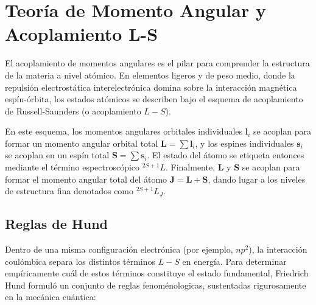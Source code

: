 \chapter{Teoría de Momento Angular y Acoplamiento L-S}
\label{ap:momento-angular}

El acoplamiento de momentos angulares es el pilar para comprender la estructura de la materia a nivel atómico. En elementos ligeros y de peso medio, donde la repulsión electrostática interelectrónica domina sobre la interacción magnética espín-órbita, los estados atómicos se describen bajo el esquema de acoplamiento de Russell-Saunders (o acoplamiento $L-S$).

En este esquema, los momentos angulares orbitales individuales $\mathbf{l}_i$ se acoplan para formar un momento angular orbital total $\mathbf{L} = \sum \mathbf{l}_i$, y los espines individuales $\mathbf{s}_i$ se acoplan en un espín total $\mathbf{S} = \sum \mathbf{s}_i$. El estado del átomo se etiqueta entonces mediante el término espectroscópico $^{2S+1}L$. Finalmente, $\mathbf{L}$ y $\mathbf{S}$ se acoplan para formar el momento angular total del átomo $\mathbf{J} = \mathbf{L} + \mathbf{S}$, dando lugar a los niveles de estructura fina denotados como $^{2S+1}L_J$.

\section{Reglas de Hund}
\label{sec:hund}

Dentro de una misma configuración electrónica (por ejemplo, $np^2$), la interacción coulómbica separa los distintos términos $L-S$ en energía. Para determinar empíricamente cuál de estos términos constituye el estado fundamental, Friedrich Hund formuló un conjunto de reglas fenoménologicas, sustentadas rigurosamente en la mecánica cuántica:


